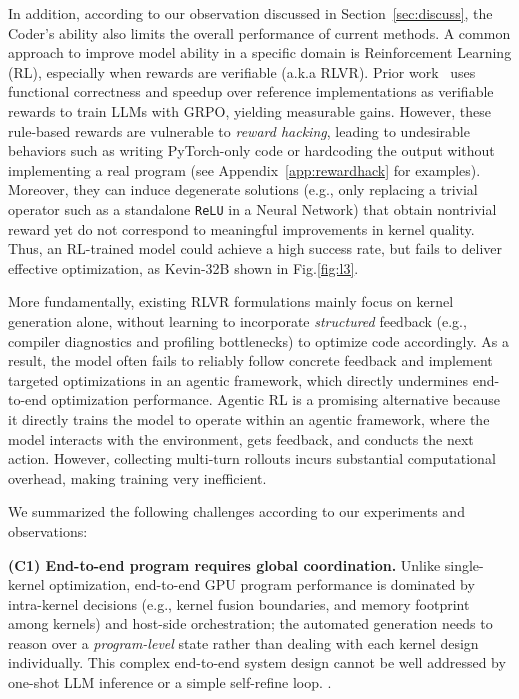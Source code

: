 In addition, according to our observation discussed in Section~\ref{sec:discuss}, the Coder's ability also limits the overall performance of current methods. 
A common approach to improve model
ability in a specific domain is Reinforcement Learning (RL), especially when rewards are verifiable
(a.k.a RLVR). Prior work~\cite{kevin,cudal2,li2025cudal1improvingcudaoptimization}
uses functional correctness and speedup over reference implementations as
verifiable rewards to train LLMs with GRPO, yielding measurable gains. However,
these rule-based rewards are vulnerable to \emph{reward hacking}, leading to undesirable behaviors such as writing PyTorch-only code or hardcoding the output without implementing a real program (see Appendix~\ref{app:rewardhack} for examples). Moreover, they
can induce degenerate solutions (e.g., only replacing a trivial operator such as a standalone \texttt{ReLU} in a Neural Network) that obtain nontrivial
reward yet do not correspond to meaningful improvements in kernel quality. Thus, an RL-trained model could achieve a high success rate, but fails to deliver effective optimization, as Kevin-32B shown in Fig.\ref{fig:l3}. 

More fundamentally, existing RLVR formulations mainly focus on kernel generation alone, without learning to incorporate \emph{structured} feedback (e.g., compiler diagnostics and profiling bottlenecks) to 
optimize code accordingly. As a result, the model often fails to reliably follow concrete feedback and implement targeted optimizations in an agentic framework, which directly undermines end-to-end optimization performance.
Agentic RL is a promising alternative because it directly trains the model to
operate within an agentic framework, where the model interacts with the environment, gets feedback, and conducts the next action. However, collecting multi-turn rollouts incurs
substantial computational overhead, making training very inefficient.





We summarized the following challenges according to our experiments and observations:

    \noindent \textbf{(C1) End-to-end program requires global coordination.}
    Unlike single-kernel optimization, end-to-end GPU program performance is dominated by intra-kernel decisions (e.g., kernel fusion boundaries, and memory footprint among kernels) and host-side orchestration; the automated generation needs to reason over a \emph{program-level} state rather than dealing with each kernel design individually. This complex end-to-end system design cannot be well addressed by one-shot LLM inference or a simple self-refine loop.
.
    
